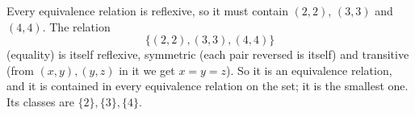 Every equivalence relation is reflexive, so it must contain $(2,2)$, $(3,3)$ and $(4,4)$. The relation
\[
\boxed{\{(2,2),(3,3),(4,4)\}}
\]
(equality) is itself reflexive, symmetric (each pair reversed is itself) and transitive (from $(x,y),(y,z)$ in it we get $x=y=z$). So it is an equivalence relation, and it is contained in every equivalence relation on the set; it is the smallest one. Its classes are $\{2\},\{3\},\{4\}$.
